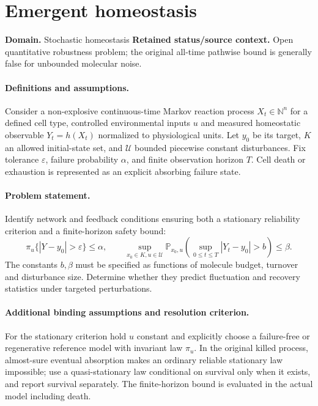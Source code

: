 \documentclass[11pt]{article}
\begin{document}
\section*{Emergent homeostasis}
\label{prob:054}
\label{rank:126}
\par\smallskip

\noindent\textbf{Domain.} Stochastic homeostasis \quad \textbf{Retained status/source context.} Open quantitative robustness problem; the original all-time pathwise bound is generally false for unbounded molecular noise.
\paragraph{Definitions and assumptions.} Consider a non-explosive continuous-time Markov reaction process $X_t\in\mathbb{N}^n$ for a defined cell type, controlled environmental inputs $u$ and measured homeostatic observable $Y_t=h(X_t)$ normalized to physiological units. Let $y_0$ be its target, $K$ an allowed initial-state set, and $\mathcal U$ bounded piecewise constant disturbances. Fix tolerance $\varepsilon$, failure probability $\alpha$, and finite observation horizon $T$. Cell death or exhaustion is represented as an explicit absorbing failure state.
\paragraph{Problem statement.} Identify network and feedback conditions ensuring both a stationary reliability criterion and a finite-horizon safety bound:
\[\pi_u\{|Y-y_0|>\varepsilon\}\le\alpha,\qquad \sup_{x_0\in K,u\in\mathcal U}\mathbb{P}_{x_0,u}\!\left(\sup_{0\le t\le T}|Y_t-y_0|>b\right)\le\beta.\]
The constants $b,\beta$ must be specified as functions of molecule budget, turnover and disturbance size. Determine whether they predict fluctuation and recovery statistics under targeted perturbations.
\paragraph{Additional binding assumptions and resolution criterion.} For the stationary criterion hold $u$ constant and explicitly choose a failure-free or regenerative reference model with invariant law $\pi_u$. In the original killed process, almost-sure eventual absorption makes an ordinary reliable stationary law impossible; use a quasi-stationary law conditional on survival only when it exists, and report survival separately. The finite-horizon bound is evaluated in the actual model including death.
\end{document}
